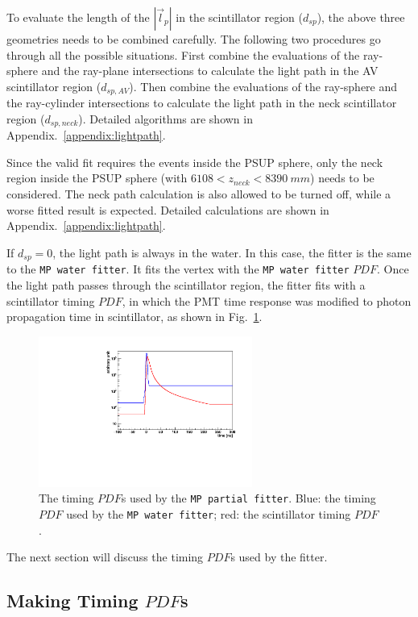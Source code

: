 To evaluate the length of the $|\vec{l}_p|$ in the scintillator region ($d_{sp}$), the above three geometries needs to be combined carefully. The following two procedures go through all the possible situations. First combine the evaluations of the ray-sphere and the ray-plane intersections to calculate the light path in the AV scintillator region ($d_{sp,AV}$). Then combine the evaluations of the ray-sphere and the ray-cylinder intersections to calculate the light path in the neck scintillator region ($d_{sp,neck}$). Detailed algorithms are shown in Appendix.~\ref{appendix:lightpath}.

Since the valid fit requires the events inside the PSUP sphere, only the neck region inside the PSUP sphere (with $6108<z_{neck}<8390~mm$) needs to be considered. The neck path calculation is also allowed to be turned off, while a worse fitted result is expected. Detailed calculations are shown in Appendix.~\ref{appendix:lightpath}.

If $d_{sp}=0$, the light path is always in the water. In this case, the fitter is the same to the \texttt{MP water fitter}. It fits the vertex with the \texttt{MP water fitter} $PDF$. Once the light path passes through the scintillator region, the fitter fits with a scintillator timing $PDF$, in which the PMT time response was modified to photon propagation time in scintillator, as shown in Fig.~\ref{partialpdf}.

\begin{figure}[htbp]
	\centering	
	\includegraphics[width=7cm]{scintpdf.pdf}
	\caption[The timing $PDF$s used by the \texttt{MP partial fitter}.]{The timing $PDF$s used by the \texttt{MP partial fitter}. Blue: the timing $PDF$ used by the \texttt{MP water fitter}; red: the scintillator timing $PDF$.}
	\label{partialpdf}
\end{figure}

The next section will discuss the timing $PDF$s used by the fitter.

\subsection{Making Timing $PDF$s}

